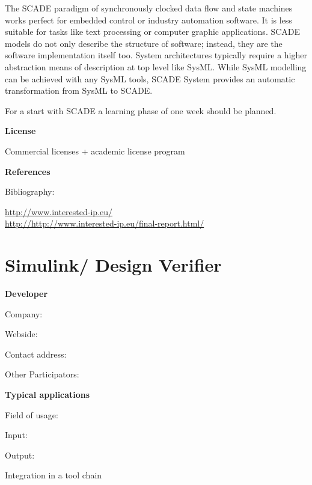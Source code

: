\documentclass{./template/openetcs_report}
\begin{document}
The SCADE paradigm of synchronously clocked data flow and state machines works perfect for embedded control or industry automation software. It is less suitable for tasks like text processing or computer graphic applications. SCADE models do not only describe the structure of software; instead, they are the software implementation itself too. System architectures typically require a higher abstraction means of description at top level like SysML. While SysML modelling can be achieved with any SysML tools, SCADE System provides an automatic transformation from SysML to SCADE. 

For a start with SCADE a learning phase of one week should be planned.   

	\textbf{License}
	
	Commercial licenses + academic license program


	\textbf{References}

	Bibliography:
	
	\url{http://www.interested-ip.eu/}\\[4pt]
	\url{http://http://www.interested-ip.eu/final-report.html/} \\[4pt]


\section{Simulink/ Design Verifier}

	\textbf{Developer}

	Company: 

	Webside:

	Contact address:

	Other  Participators:



	\textbf{Typical applications}

	Field of usage:


	Input:

	Output:





	Integration in a tool chain
\end{document}
